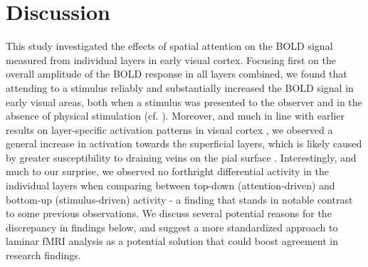 \documentclass[9pt,lineno]{aperture}
\begin{document}
\begin{figure}
\label{figsupp:layerresults4layers}
\label{figsupp:layerresultsinterp}

\end{figure}

\section{Discussion}
This study investigated the effects of spatial attention on the BOLD signal measured from individual layers in early visual cortex. Focusing first on the overall amplitude of the BOLD response in all layers combined, we found that attending to a stimulus reliably and substantially increased the BOLD signal in early visual areas, both when a stimulus was presented to the observer and in the absence of physical stimulation (cf. \citep{Kastner1999,Murray2008,Li2008}). Moreover, and much in line with earlier results on layer-specific activation patterns in visual cortex \citep{Koopmans2010,Polimeni2010}, we observed a general increase in activation towards the superficial layers, which is likely caused by greater susceptibility to draining veins on the pial surface \citep{Koopmans2011}. Interestingly, and much to our surprise, we observed no forthright differential activity in the individual layers when comparing between top-down (attention-driven) and bottom-up (stimulus-driven) activity - a finding that stands in notable contrast to some previous observations. We discuss several potential reasons for the discrepancy in findings below, and suggest a more standardized approach to laminar fMRI analysis as a potential solution that could boost agreement in research findings.
\end{document}

